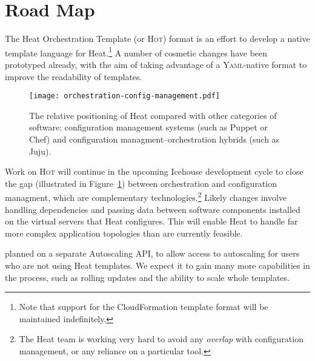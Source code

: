 \section{Road Map}

The Heat Orchestration Template (or \textsc{Hot}) format is an effort to develop a native template language for Heat.\footnote{Note that support for the CloudFormation template format will be maintained indefinitely.} A number of cosmetic changes have been prototyped already, with the aim of taking advantage of a \textsc{Yaml}-native format to improve the readability of templates.

\begin{figure}[t]
\centering
\texttt{[image: orchestration-config-management.pdf]}
\caption{The relative positioning of Heat compared with other categories of software: configuration management systems (such as Puppet or Chef) and configuration managment--orchestration hybrids (such as Juju).}
\label{fig:orchestration-config-management}
\end{figure}

Work on \textsc{Hot} will continue in the upcoming Icehouse development cycle to close the gap (illustrated in Figure~\ref{fig:orchestration-config-management}) between orchestration and configuration managment, which are complementary technologies.\footnote{The Heat team is working very hard to avoid any \emph{overlap} with configuration management, or any reliance on a particular tool.} Likely changes involve handling dependencies and passing data between software components installed on the virtual servers that Heat configures. This will enable Heat to handle far more complex application topologies than are currently feasible.

 planned on a separate Autoscaling API, to allow access to autoscaling for users who are not using Heat templates. We expect it to gain many more capabilities in the process, such as rolling updates and the ability to scale whole templates.
